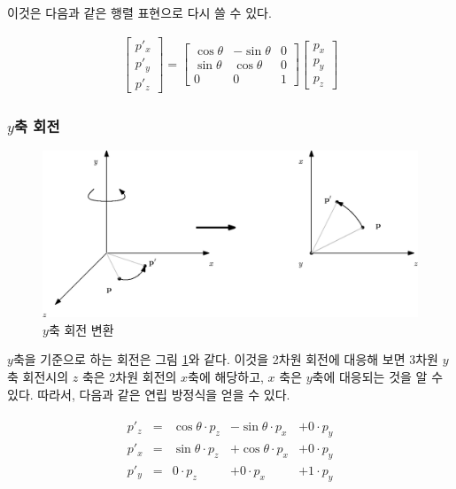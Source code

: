 이것은 다음과 같은 행렬 표현으로 다시 쓸 수 있다.

\begin{eqnarray}
\left [ \begin{array}{c} p'_x \\ p'_y \\ p'_z  \end{array} \right ] 
=
\left [ \begin{array}{rrr}
\cos \theta &- \sin \theta  & 0  \\
\sin \theta & \cos \theta  & 0 \\
0 & 0  & 1 
\end{array} \right ]
\left [ \begin{array}{c} p_x \\ p_y \\ p_z \end{array} \right ] 
\end{eqnarray}

\subsubsection{$y$축 회전}

\begin{figure}[h!]
  \centering
    \includegraphics[width=15cm]{Math_transform/yAxisRotation.eps}
    \caption{$y$축 회전 변환}
    \label{fig:transform:yAxisRotation}
\end{figure}

$y$축을 기준으로 하는 회전은 그림 \ref{fig:transform:yAxisRotation}와 같다. 이것을 2차원 회전에 대응해 보면
3차원 $y$축 회전시의 $z$ 축은 2차원 회전의 $x$축에 해당하고, $x$ 축은 $y$축에 대응되는 것을 알 수 있다.
따라서, 다음과 같은 연립 방정식을 얻을 수 있다.

\begin{eqnarray}
\begin{array}{clrrr}
p'_z  & = &\cos \theta \cdot p_z &- \sin \theta \cdot p_x &+ 0 \cdot p_y \\
p'_x  & = &\sin \theta \cdot p_z &+ \cos \theta \cdot p_x &+ 0 \cdot p_y \\
p'_y  & = & 0 \cdot p_z &+ 0 \cdot p_x &+ 1 \cdot p_y
\end{array}
\end{eqnarray}


